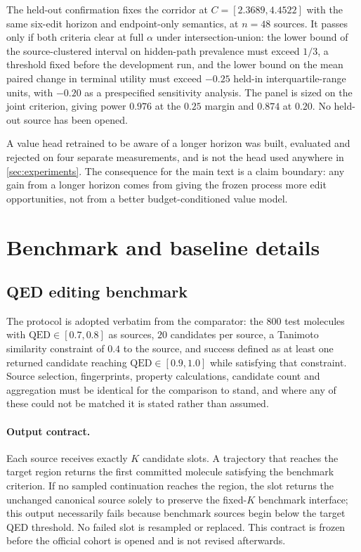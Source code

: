 The held-out confirmation fixes the corridor at $C=[2.3689,4.4522]$ with the same six-edit horizon and endpoint-only semantics, at $n=48$ sources. It passes only if both criteria clear at full $\alpha$ under intersection-union: the lower bound of the source-clustered interval on hidden-path prevalence must exceed $1/3$, a threshold fixed before the development run, and the lower bound on the mean paired change in terminal utility must exceed $-0.25$ held-in interquartile-range units, with $-0.20$ as a prespecified sensitivity analysis. The panel is sized on the joint criterion, giving power $0.976$ at the $0.25$ margin and $0.874$ at $0.20$. No held-out source has been opened.

A value head retrained to be aware of a longer horizon was built, evaluated and rejected on four separate measurements, and is not the head used anywhere in \cref{sec:experiments}. The consequence for the main text is a claim boundary: any gain from a longer horizon comes from giving the frozen process more edit opportunities, not from a better budget-conditioned value model.

\section{Benchmark and baseline details}
\label{app:alignment}

\subsection{{QED} editing benchmark}
\label{app:bench-qed}

The protocol is adopted verbatim from the comparator: the $800$ test molecules with $\mathrm{QED}\in[0.7,0.8]$ as sources, $20$ candidates per source, a Tanimoto similarity constraint of $0.4$ to the source, and success defined as at least one returned candidate reaching $\mathrm{QED}\in[0.9,1.0]$ while satisfying that constraint. Source selection, fingerprints, property calculations, candidate count and aggregation must be identical for the comparison to stand, and where any of these could not be matched it is stated rather than assumed.

\paragraph{Output contract.} Each source receives exactly $K$ candidate slots. A trajectory that reaches the target region returns the first committed molecule satisfying the benchmark criterion. If no sampled continuation reaches the region, the slot returns the unchanged canonical source solely to preserve the fixed-$K$ benchmark interface; this output necessarily fails because benchmark sources begin below the target QED threshold. No failed slot is resampled or replaced. This contract is frozen before the official cohort is opened and is not revised afterwards.


